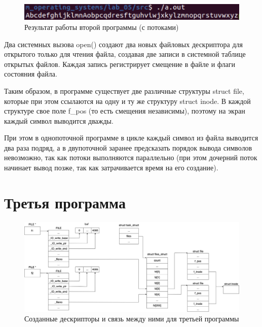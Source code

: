 \documentclass[12pt]{report}
\begin{document}
\begin{figure}[H]
	\centering
	\includegraphics[scale=1]{img/prog_02_thread.png}
	\caption{Результат работы второй программы (с потоками)}
	\label{fig:prog_02_thread}
\end{figure}




Два системных вызова open() создают два новых файловых дескриптора для открытого только для чтения файла, создавая две записи в системной таблице открытых файлов. Каждая запись регистрирует смещение в файле и флаги состояния файла. 

Таким образом, в программе существует две различные структуры struct file, которые при этом ссылаются на одну и ту же структуру struct inode. В каждой структуре свое поле f\_pos (то есть смещения независимы), поэтому на экран каждый символ выводится дважды.

При этом в однопоточной программе в цикле каждый символ из файла выводится два раза подряд, а в двупоточной заранее предсказать порядок вывода символов невозможно, так как потоки выполняются параллельно (при этом дочерний поток начинает вывод позже, так как затрачивается время на его создание).






\chapter{Третья программа}

\begin{figure}[H]
	\centering
	\includegraphics[scale=0.3]{img/prog_03_schema.jpg}
	\caption{Созданные дескрипторы и связь между ними для третьей программы}
	\label{fig:prog_03_schema}
\end{figure}
\end{document}
